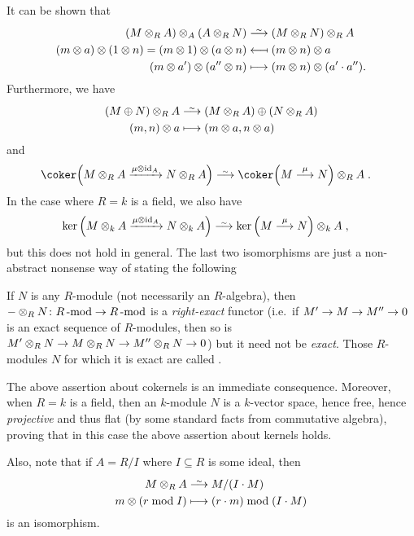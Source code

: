 \documentclass[a4paper,parskip=half,numbers=enddot, DIV=12]{scrreprt}
\begin{document}
It can be shown that
\begin{align*}
    (M\otimes_R A)\otimes_A(A\otimes_R N)&\isomorphism (M\otimes_R N) \otimes_R A\\
    (m\otimes a)\otimes(1\otimes n) = (m\otimes 1)\otimes(a\otimes n) &\longmapsfrom (m\otimes n)\otimes a\\
    (m\otimes a')\otimes(a''\otimes n) &\longmapsto (m\otimes n)\otimes(a'\cdot a'').
\end{align*}
Furthermore, we have
\begin{align*}
    (M\oplus N) \otimes_R A &\isomorphism (M\otimes_R A)\oplus(N\otimes_R A)\\
    (m,n)\otimes a &\longmapsto (m\otimes a, n\otimes a)
\end{align*}
and 
\begin{align*}
    \coker\Big(M\otimes_R A\xrightarrow{\mu\otimes \id_A} N\otimes_R A\Big) &\isomorphism \coker\Big(M\morphism[\mu] N\Big)\otimes_R A\;.
\end{align*}
In the case where $R=k$ is a field, we also have 
\begin{align*}
    \ker\Big(M\otimes_kA \xrightarrow{\mu\otimes \id_A} N\otimes_k A\Big) &\isomorphism \ker\left(M\morphism[\mu] N \right)\otimes_k A\;,
\end{align*}
but this does not hold in general. The last two isomorphisms are just a non-abstract nonsense way of stating the following
\begin{fact}
	If $N$ is any $R$-module (not necessarily an $R$-algebra), then $-\otimes_RN\colon R\cat{-mod}\morphism R\cat{-mod}$ is a \emph{right-exact} functor (i.e.\ if $M'\morphism M\morphism M''\morphism0$ is an exact sequence of $R$-modules, then so is $M'\otimes_RN\morphism M\otimes_RN\morphism M''\otimes_RN\morphism 0$) but it need not be \emph{exact}. Those $R$-modules $N$ for which it is exact are called .
\end{fact}
The above assertion about cokernels is an immediate consequence. Moreover, when $R=k$ is a field, then an $k$-module $N$ is a $k$-vector space, hence free, hence \emph{projective} and thus flat (by some standard facts from commutative algebra), proving that in this case the above assertion about kernels holds.

\begin{fact}
	Also, note that if $A=R/I$ where $I\subseteq R$ is some ideal, then 
	\begin{align*}
		M\otimes_R A &\isomorphism M/(I\cdot M)\\
		m\otimes(r\bmod I) &\longmapsto (r\cdot m) \bmod (I\cdot M)
	\end{align*}
	is an isomorphism.
\end{fact}
\end{document}
